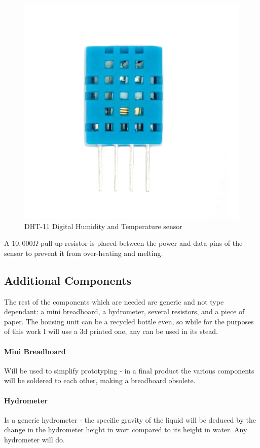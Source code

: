 \documentclass[twoside]{ctuthesis}
\theoremstyle{plain}
\theoremstyle{definition}
\theoremstyle{note}
\begin{document}
\begin{figure}[H]
	\centering
	\includegraphics[scale=0.5]{DHT11}
	\caption{DHT-11 Digital Humidity and Temperature sensor\cite{HC-SR04}}
\end{figure}

A $10,000\Omega$ pull up resistor is placed between the power and data pins of the sensor to prevent it from over-heating and melting.

\subsection{Additional Components}
The rest of the components which are needed are generic and not type dependant: a mini breadboard, a hydrometer, several resistors, and a piece of paper. The housing unit can be a recycled bottle even, so while for the purposes of this work I will use a 3d printed one, any can be used in its stead.\\
\paragraph{Mini Breadboard} Will be used to simplify prototyping - in a final product the various components will be soldered to each other, making a breadboard obsolete.
\paragraph{Hydrometer} Is a generic hydrometer - the specific gravity of the liquid will be deduced by the change in the hydrometer height in wort compared to its height in water. Any hydrometer will do.
\end{document}
